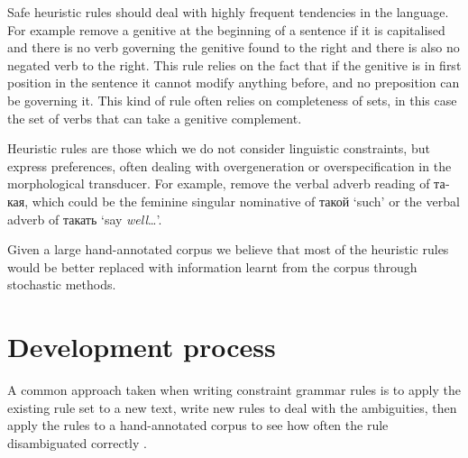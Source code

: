 \documentclass[11pt]{article}
\newcommand{\rus}[1]{\foreignlanguage{russian}{#1}}
\begin{document}

Safe heuristic rules should deal with highly frequent tendencies in the language.
For example remove a genitive at the beginning of a sentence if it is capitalised
and there is no verb governing the genitive found to the right and there is also no
negated verb to the right. This rule relies on the fact that if the genitive is in first 
position in the sentence it cannot modify anything before, and no preposition 
can be governing it. This kind of rule often relies on completeness of sets, 
in this case the set of verbs that can take a genitive complement.



Heuristic rules are those which we do not consider linguistic constraints, but express
preferences, often dealing with overgeneration or overspecification in the morphological
transducer. For example, remove the verbal adverb reading of \rus{такая}, which could be 
the feminine singular nominative of \rus{такой} `such' or the verbal adverb 
of \rus{такать} `say \emph{well}\ldots'.


Given a large hand-annotated corpus we believe that most of the heuristic rules would be 
better replaced with information learnt from the corpus through stochastic methods. 



\section{Development process}
\label{sec:devel}

A common approach taken when writing constraint grammar rules is to 
apply the existing rule set to a new text, write new rules to deal with the 
ambiguities, then apply the rules to a hand-annotated corpus to see
how often the rule disambiguated correctly \cite{voutilainen99}.
\end{document}
